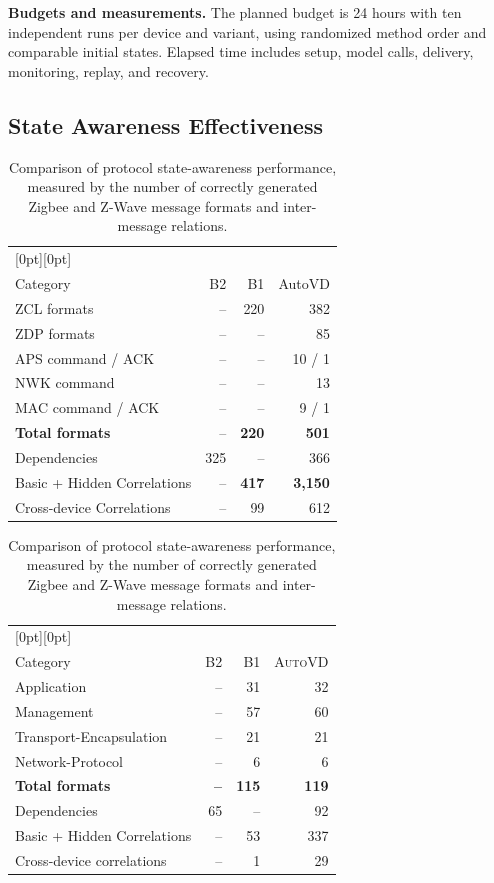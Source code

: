 \documentclass[10pt,journal,compsoc]{IEEEtran}
\newcommand{\system}{\textsc{AutoVD}}
\newcommand{\parab}[1]{\vspace{0.04in}\noindent\textbf{#1}}
\newcommand{\todo}[1]{\textcolor{red}{[TODO: #1]}}
\begin{document}
\parab{Budgets and measurements.} 
The planned budget is 24 hours with ten independent runs per device and variant, using randomized method order and comparable initial states. Elapsed time includes setup, model calls, delivery, monitoring, replay, and recovery.

\subsection{State Awareness Effectiveness}\label{sec:overall-results}

\begin{table}[t]
\centering
\caption{Comparison of protocol state-awareness performance, measured by the number of correctly generated Zigbee and Z-Wave message formats and inter-message relations.}
\label{tab:reference-protocol}
\small

\begin{tabularx}{\columnwidth}{@{}X r r r@{}}
\toprule
\rowcolor{zigbeebg}[0pt][0pt]
\multicolumn{4}{@{}l@{}}{\textbf{Zigbee}} \\
Category & B2 & B1 & AutoVD \\
\midrule
ZCL formats & -- & 220 & 382 \\
ZDP formats & -- & -- & 85 \\
APS command / ACK & -- & -- & 10 / 1 \\
NWK command & -- & -- & 13 \\
MAC command / ACK & -- & -- & 9 / 1 \\
\textbf{Total formats} & -- & \textbf{220} & \textbf{501} \\
\midrule
Dependencies & 325 & -- & 366 \\
Basic + Hidden Correlations & -- & \textbf{417} & \textbf{3,150} \\
Cross-device  Correlations & -- & 99 & 612 \\
\bottomrule
\end{tabularx}

\smallskip

\begin{tabularx}{\columnwidth}{@{}X r r r@{}}
\toprule
\rowcolor{zwavebg}[0pt][0pt]
\multicolumn{4}{@{}l@{}}{\textbf{Z-Wave}} \\
Category & B2 & B1 & \system{} \\
\midrule
Application & -- & 31 & 32 \\
Management & -- & 57 & 60 \\
Transport-Encapsulation & -- & 21 & 21 \\
Network-Protocol & -- & 6 & 6 \\
\textbf{Total formats} & \textbf{--} & \textbf{115} & \textbf{119} \\
\midrule
Dependencies & 65 & -- & 92 \\
Basic + Hidden Correlations & -- & 53 & 337 \\
Cross-device correlations & -- & 1 & 29 \\
\bottomrule
\end{tabularx}
\end{table}
\end{document}
